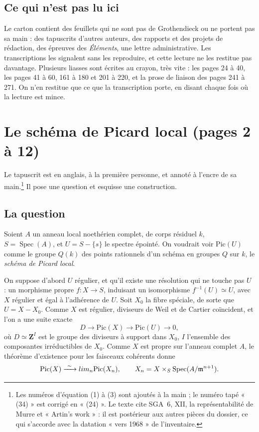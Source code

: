 \documentclass[11pt,a4paper]{article}
\begin{document}
\subsection*{Ce qui n'est pas lu ici}

Le carton contient des feuillets qui ne sont pas de Grothendieck ou ne portent
pas sa main : des tapuscrits d'autres auteurs, des rapports et des projets de
rédaction, des épreuves des \emph{Éléments}, une lettre administrative. Les
transcriptions les signalent sans les reproduire, et cette lecture ne les
restitue pas davantage. Plusieurs liasses sont écrites au crayon, très vite :
les pages 24 à 40, les pages 41 à 60, 161 à 180 et 201 à 220, et la prose de
liaison des pages 241 à 271. On n'en restitue que ce que la transcription
porte, en disant chaque fois où la lecture est mince.

\section*{Le schéma de Picard local (pages 2 à 12)}

Le tapuscrit est en anglais, à la première personne, et annoté à l'encre de sa
main.\footnote{Les numéros d'équation (1) à (3) sont ajoutés à la main ; le
numéro tapé « (34) » est corrigé en « (24) ». Le texte cite SGA~6, XII, la
représentabilité de Murre et « Artin's work » : il est postérieur aux autres
pièces du dossier, ce qui s'accorde avec la datation « vers 1968 » de
l'inventaire.} Il pose une question et esquisse une construction.

\subsection*{La question}

Soient $A$ un anneau local noethérien complet, de corps résiduel $k$,
$S = \operatorname{Spec}(A)$, et $U = S - \{s\}$ le spectre épointé. On
voudrait voir $\mathrm{Pic}(U)$ comme le groupe $Q(k)$ des points rationnels
d'un schéma en groupes $Q$ sur $k$, le \emph{schéma de Picard local}.

On suppose d'abord $U$ régulier, et qu'il existe une résolution qui ne touche
pas $U$ : un morphisme propre $f \colon X \to S$, induisant un isomorphisme
$f^{-1}(U) \simeq U$, avec $X$ régulier et égal à l'adhérence de $U$. Soit
$X_0$ la fibre spéciale, de sorte que $U = X - X_0$. Comme $X$ est régulier,
diviseurs de Weil et de Cartier coïncident, et l'on a une suite exacte
\[
D \longrightarrow \mathrm{Pic}(X) \longrightarrow \mathrm{Pic}(U) \longrightarrow 0 ,
\]
où $D \simeq \mathbf{Z}^I$ est le groupe des diviseurs à support dans $X_0$,
$I$ l'ensemble des composantes irréductibles de $X_0$. Comme $X$ est propre sur
l'anneau complet $A$, le théorème d'existence pour les faisceaux cohérents donne
\[
\mathrm{Pic}(X) \xrightarrow{\ \sim\ } \varprojlim_n \mathrm{Pic}(X_n), \qquad
X_n = X \times_S \operatorname{Spec}(A/\mathfrak{m}^{n+1}) .
\]
\end{document}
